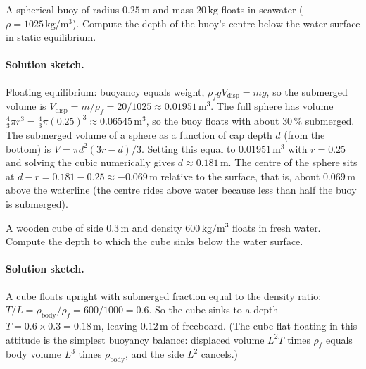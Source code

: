 \begin{exercise}
A spherical buoy of radius $0.25\,\si{\meter}$ and mass $20\,
\si{\kilogram}$ floats in seawater ($\rho = 1025\,\si{\kilogram
\per\meter\cubed}$). Compute the depth of the buoy's centre
below the water surface in static equilibrium.

\paragraph{Solution sketch.} Floating equilibrium: buoyancy equals
weight, $\rho_f g V_{\text{disp}} = m g$, so the submerged volume is
$V_{\text{disp}} = m/\rho_f = 20/1025 \approx 0.01951\,\text{m}^3$. The
full sphere has volume $\tfrac43\pi r^3 = \tfrac43\pi (0.25)^3 \approx
0.06545\,\text{m}^3$, so the buoy floats with about $30\,\%$ submerged.
The submerged volume of a sphere as a function of cap depth $d$ (from
the bottom) is $V = \pi d^2 (3r - d)/3$. Setting this equal to
$0.01951\,\text{m}^3$ with $r = 0.25$ and solving the cubic numerically
gives $d \approx 0.181\,\si{\meter}$. The centre of the sphere sits at
$d - r = 0.181 - 0.25 \approx -0.069\,\si{\meter}$ relative to the
surface, that is, about $0.069\,\si{\meter}$ above the waterline (the
centre rides above water because less than half the buoy is submerged).
\end{exercise}

\begin{exercise}
A wooden cube of side $0.3\,\si{\meter}$ and density $600\,\si{
\kilogram\per\meter\cubed}$ floats in fresh water. Compute the
depth to which the cube sinks below the water surface.

\paragraph{Solution sketch.} A cube floats upright with submerged
fraction equal to the density ratio: $T/L = \rho_{\text{body}}/\rho_f =
600/1000 = 0.6$. So the cube sinks to a depth $T = 0.6 \times 0.3 =
0.18\,\si{\meter}$, leaving $0.12\,\si{\meter}$ of freeboard. (The cube
flat-floating in this attitude is the simplest buoyancy balance:
displaced volume $L^2 T$ times $\rho_f$ equals body volume $L^3$ times
$\rho_{\text{body}}$, and the side $L^2$ cancels.)
\end{exercise}

